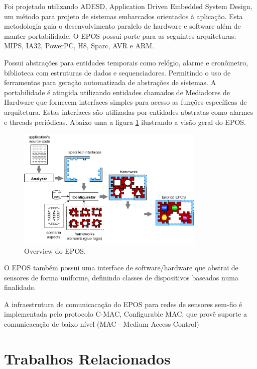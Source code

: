 Foi projetado utilizando ADESD, Application Driven Embedded System Design, um m\'etodo para projeto de sistemas embarcados orientados \`a aplica\c{c}\~ao. Esta metodologia guia o desenvolvimento paralelo de hardware e software al\'em de manter portabilidade. O EPOS possui porte para as seguintes arquiteturas: MIPS, IA32, PowerPC, H8, Sparc, AVR e ARM. \cite{eposProject}

Possui abstra\c{c}\~oes para entidades temporais como rel\'ogio, alarme e cron\^ometro, biblioteca com estruturas de dados e sequenciadores. Permitindo o uso de ferramentas para gera\c{c}\~ao automatizada de abstra\c{c}\~oes de sistemas. A portabilidade \'e atingida utilizando entidades chamados de Mediadores de Hardware que fornecem interfaces simples para acesso as fun\c{c}\~oes espec\'ificas de arquitetura. Estas interfaces s\~ao utilizadas por entidades abstratas como alarmes e threads peri\'odicas. Abaixo uma a figura \ref{eposOverview} ilustrando a vis\~ao geral do EPOS.

\begin{figure}[h]
   \label{eposOverview}
   \centering
   \includegraphics[width=0.8\textwidth]{figuras/eposOverview.png}
   \caption{Overview do EPOS.}
\end{figure}

 
O EPOS tamb\'em possui uma interface de software/hardware que abstrai de sensores de forma uniforme, definindo classes de dispositivos baseados numa finalidade.\cite{epos}

A infraestrutura de comunicaca\c{c}\~ao do EPOS para redes de sensores sem-fio \'e implementada pelo protocolo C-MAC, Configurable MAC, que prov\^e suporte a comunicaca\c{c}\~ao de baixo n\'ivel (MAC - Medium Access Control)

\section{Trabalhos Relacionados}

